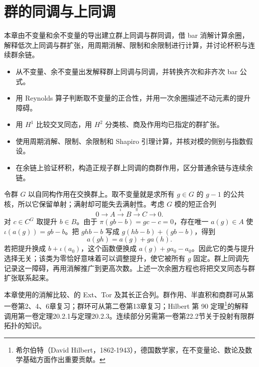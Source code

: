 
\chapter{群的同调与上同调}
\label{b4:ch:11}

\begin{chapterabstract}
	本章由不变量和余不变量的导出建立群上同调与群同调，借 bar 消解计算余圈，解释低次上同调与群扩张，用周期消解、限制和余限制进行计算，并讨论杯积与连续群余链。
\end{chapterabstract}

\begin{learninggoals}
	\begin{itemize}
		\item 从不变量、余不变量出发解释群上同调与同调，并转换齐次和非齐次 bar 公式。
		\item 用 Reynolds 算子判断取不变量的正合性，并用一次余圈描述不动元素的提升障碍。
		\item 用 \(H^1\) 比较交叉同态，用 \(H^2\) 分类核、商及作用均已指定的群扩张。
		\item 使用周期消解、限制、余限制和 Shapiro 引理计算，并核对模的侧别与指数假设。
		\item 在余链上验证杯积，构造正规子群上同调的商群作用，区分普通余链与连续余链。
	\end{itemize}
\end{learninggoals}

令群 \(G\) 以自同构作用在交换群上。取不变量就是求所有 \(g\in G\) 的 \(g-1\) 的公共核，所以它保留单射；满射却可能失去满射性。考虑 \(G\) 模的短正合列
\[
	0\longrightarrow A\xrightarrow{\iota}B\xrightarrow{\pi}C\longrightarrow0.
\]
对 \(c\in C^G\) 取提升 \(b\in B\)。由于 \(\pi(gb-b)=gc-c=0\)，存在唯一 \(a(g)\in A\) 使 \(\iota(a(g))=gb-b\)。把 \(ghb-b\) 写成 \(g(hb-b)+(gb-b)\)，得到
\[
	a(gh)=a(g)+ga(h).
\]
若把提升换成 \(b+\iota(a_0)\)，这个函数便换成 \(a(g)+ga_0-a_0\)。因此它的类与提升选择无关；该类为零恰好意味着可以调整提升，使它被所有 \(g\) 固定。群上同调先记录这一障碍，再用消解推广到更高次数。上述一次余圈方程也将把交叉同态与群扩张联系起来。

\ProseParagraphBreak
本章使用的消解比较、的 Ext、Tor 及其长正合列。群作用、半直积和商群可从第一卷第2、4、6章复习；群环可从第二卷第13章复习；Hilbert 第 90 定理\footnote{希尔伯特（David Hilbert，1862-1943），德国数学家，在不变量论、数论及数学基础方面作出重要贡献。}的解释调用第一卷定理20.2.1与定理20.2.3。连续部分另需第一卷第22.2节关于投射有限群拓扑的知识。


